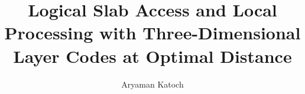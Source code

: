 \documentclass[aps,prx,reprint,superscriptaddress,nofootinbib,floatfix,longbibliography]{revtex4-2}
\theoremstyle{definition}
\begin{document}
\title{Logical Slab Access and Local Processing with Three-Dimensional\\ Layer Codes at Optimal Distance}
\author{Aryaman Katoch}


\end{document}
